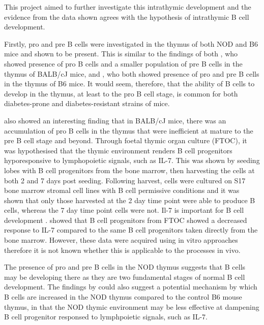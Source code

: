 This project aimed to further investigate this intrathymic development and the evidence from the data shown agrees with the hypothesis of intrathymic B cell development.

Firstly, pro and pre B cells were investigated in the thymus of both NOD and B6 mice and shown to be present. 
This is similar to the findings of both \citet{Hashimoto2002}, who showed presence of pro B cells and a smaller population of pre B cells in the thymus of BALB/cJ mice, and \citet{Akashi2000}, who both showed presence of pro and pre B cells in the thymus of B6 mice.
It would seem, therefore, that the ability of B cells to develop in the thymus, at least to the pro B cell stage, is common for both diabetes-prone and diabetes-resistant strains of mice.

\citet{Hashimoto2002} also showed an interesting finding that in BALB/cJ mice, there was an accumulation of pro B cells in the thymus that were inefficient at mature to the pre B cell stage and beyond.
Through foetal thymic organ culture (FTOC), it was hypothesised that the thymic environment renders B cell progenitors hyporesponsive to lymphopoietic signals, such as IL-7.
This was shown by seeding lobes with B cell progenitors from the bone marrow, then harvesting the cells at both 2 and 7 days post seeding.
Following harvest, cells were cultured on S17 bone marrow stromal cell lines with B cell permissive conditions and it was shown that only those harvested at the 2 day time point were able to produce B cells, whereas the 7 day time point cells were not.
Il-7 is important for B cell development \citep{Corfe2012}. \citet{Hashimoto2002} showed that B cell progenitors from FTOC showed a decreased response to IL-7 compared to the same B cell progenitors taken directly from the bone marrow.
However, these data were acquired using in vitro approaches therefore it is not known whether this is applicable to the processes in vivo.

The presence of pro and pre B cells in the NOD thymus suggests that B cells may be developing there as they are two fundamental stages of normal B cell development.
The findings by \citet{Hashimoto2002} could also suggest a potential mechanism by which B cells are increased in the NOD thymus compared to the control B6 mouse thymus, in that the NOD thymic environment may be less effective at dampening B cell progenitor responsed to lymphpoietic signals, such as IL-7.

